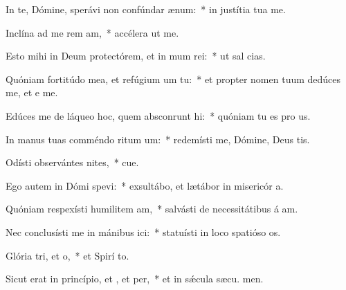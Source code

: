 \item In te, Dómine, sperávi non confúndar  ænum:~* in justítia tua  me.
\item Inclína ad me rem am,~* accélera ut  me.
\item Esto mihi in Deum protectórem, et in mum rei:~* ut sal  cias.
\item Quóniam fortitúdo mea, et refúgium um  tu:~* et propter nomen tuum dedúces me, et e me.
\item Edúces me de láqueo hoc, quem absconrunt hi:~* quóniam tu es pro us.
\item In manus tuas comméndo ritum um:~* redemísti me, Dómine, Deus tis.
\item Odísti observántes nites,~* cue.
\item Ego autem in Dómi spevi:~* exsultábo, et lætábor in misericór a.
\item Quóniam respexísti humilitem am,~* salvásti de necessitátibus á am.
\item Nec conclusísti me in mánibus ici:~* statuísti in loco spatióso  os.
\item Glória tri, et o,~* et Spirí to.
\item Sicut erat in princípio, et , et per,~* et in sǽcula sæcu. men.
